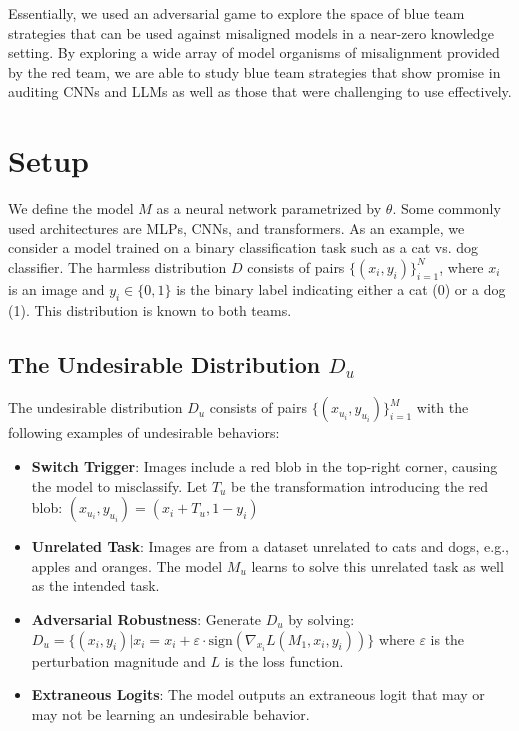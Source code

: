 \documentclass[letterpaper]{article} %
\begin{document}
Essentially, we used an adversarial game to explore the space of blue team strategies that can be used against misaligned models in a near-zero knowledge setting. By exploring a wide array of model organisms of misalignment provided by the red team, we are able to study blue team strategies that show promise in auditing CNNs and LLMs as well as those that were challenging to use effectively.


\section{Setup}
We define the model $M$ as a neural network parametrized by $\theta$. Some commonly used architectures are MLPs, CNNs, and transformers. As an example, we consider a model trained on a binary classification task such as a cat vs. dog classifier. The harmless distribution $D$ consists of pairs $\{(x_i, y_i)\}_{i=1}^{N}$, where $x_i$ is an image and $y_i \in \{0, 1\}$ is the binary label indicating either a cat (0) or a dog (1). This distribution is known to both teams.

\subsection{The Undesirable Distribution $D_u$}

The undesirable distribution $D_u$ consists of pairs $\{(x_{u_i}, y_{u_i})\}_{i=1}^{M}$ with the following examples of undesirable behaviors:

\begin{itemize}
    \item \textbf{Switch Trigger}: Images include a red blob in the top-right corner, causing the model to misclassify. Let $T_u$ be the transformation introducing the red blob: $(x_{u_i}, y_{u_i}) = (x_i + T_u, 1 - y_i)$
    \item \textbf{Unrelated Task}: Images are from a dataset unrelated to cats and dogs, e.g., apples and oranges. The model $M_u$ learns to solve this unrelated task as well as the intended task.
    \item \textbf{Adversarial Robustness}: Generate $D_u$ by solving:
    $D_u = \{(x_i, y_i) | x_i = x_i + \varepsilon \cdot \text{sign}(\nabla_{x_i} L(M_1, x_i, y_i))\}$
    where $\varepsilon$ is the perturbation magnitude and $L$ is the loss function.
    \item \textbf{Extraneous Logits}: The model outputs an extraneous logit that may or may not be learning an undesirable behavior.
\end{itemize}
\end{document}
